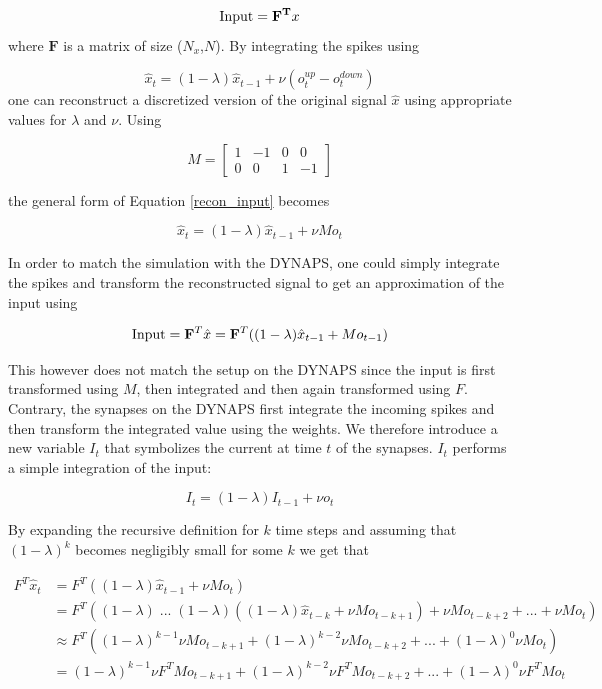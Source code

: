 \documentclass[twoside,11pt]{article}
\begin{document}
\begin{equation}
  \textnormal{Input} = \mathbf{F^T}x
\end{equation}
where $\mathbf{F}$ is a matrix of size ($N_x$,$N$). By integrating the spikes using

\begin{equation} \label{recon_input}
  \hat{x}_t = (1-\lambda)\hat{x}_{t-1} + \nu(o^{up}_t - o^{down}_t)
\end{equation}
one can reconstruct a discretized version of the original signal $\hat{x}$ using appropriate values
for $\lambda$ and $\nu$. Using

\[M = \begin{bmatrix}
  1 & -1 & 0 & 0 \\ 
  0 & 0 & 1 & -1
  \end{bmatrix}
\]

the general form of Equation \ref{recon_input} becomes

\begin{equation}
  \hat{x}_t = (1-\lambda)\hat{x}_{t-1} + \nu Mo_t
\end{equation}

In order to match the simulation with the DYNAPS, one could simply integrate the spikes and transform
the reconstructed signal to get an approximation of the input using

\begin{equation}
  \textnormal{Input} = \mathbf{F}^T \hat{x} = \mathbf{F}^T((1-\lambda)\hat{x}_{t-1} + Mo_{t-1})
\end{equation}

This however does not match the setup on the DYNAPS since the input is first transformed using $M$, then
integrated and then again transformed using $F$. Contrary, the synapses on the DYNAPS first integrate the
incoming spikes and then transform the integrated value using the weights. We therefore introduce a new variable
$I_t$ that symbolizes the current at time $t$ of the synapses. $I_t$ performs a simple integration of the input:

\begin{equation*}
  I_t = (1-\lambda)I_{t-1} + \nu o_t
\end{equation*}

By expanding the recursive definition for $k$ time steps and assuming that $(1-\lambda)^k$ becomes
negligibly small for some $k$ we get that

\begin{equation*}
  \begin{split}
      F^T \hat{x}_t & = F^T((1-\lambda) \hat{x}_{t-1} + \nu Mo_t) \\
      & = F^T((1-\lambda) \;... \;(1-\lambda)( (1-\lambda) \hat{x}_{t-k} + \nu Mo_{t-k+1}) + \nu Mo_{t-k+2} + ... + \nu Mo_t) \\
      & \approx F^T((1-\lambda)^{k-1} \nu Mo_{t-k+1} + (1-\lambda)^{k-2} \nu Mo_{t-k+2} + ... + (1-\lambda)^{0} \nu Mo_{t}) \\
      & = (1-\lambda)^{k-1} \nu F^TMo_{t-k+1} + (1-\lambda)^{k-2} \nu F^TMo_{t-k+2} + ... + (1-\lambda)^0 \nu F^TMo_t
  \end{split}
  \end{equation*}
\end{document}
